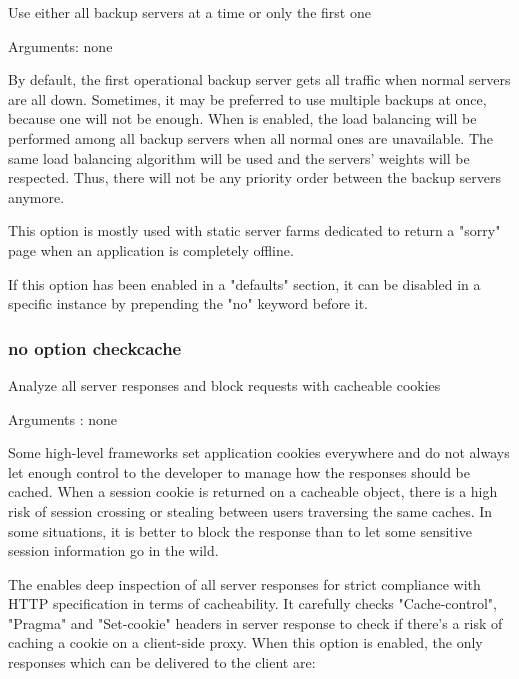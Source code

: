   Use either all backup servers at a time or only the first one


  Arguments: none

  By default, the first operational backup server gets all traffic when normal
  servers are all down. Sometimes, it may be preferred to use multiple backups
  at once, because one will not be enough. When  is enabled,
  the load balancing will be performed among all backup servers when all normal
  ones are unavailable. The same load balancing algorithm will be used and the
  servers' weights will be respected. Thus, there will not be any priority
  order between the backup servers anymore.

  This option is mostly used with static server farms dedicated to return a
  "sorry" page when an application is completely offline.

  If this option has been enabled in a "defaults" section, it can be disabled
  in a specific instance by prepending the "no" keyword before it.

\subsubsection[checkcache]{}
\subsubsection*{no option checkcache}

  Analyze all server responses and block requests with cacheable cookies


  Arguments : none

  Some high-level frameworks set application cookies everywhere and do not
  always let enough control to the developer to manage how the responses should
  be cached. When a session cookie is returned on a cacheable object, there is a
  high risk of session crossing or stealing between users traversing the same
  caches. In some situations, it is better to block the response than to let
  some sensitive session information go in the wild.

  The  enables deep inspection of all server responses for
  strict compliance with HTTP specification in terms of cacheability. It
  carefully checks "Cache-control", "Pragma" and "Set-cookie" headers in server
  response to check if there's a risk of caching a cookie on a client-side
  proxy. When this option is enabled, the only responses which can be delivered
  to the client are:

